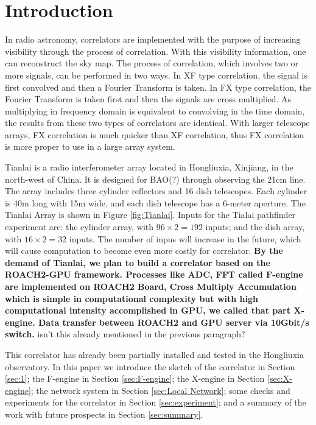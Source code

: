\documentclass{ws-jai}
\begin{document}
\section{Introduction}

	In radio astronomy, correlators are implemented with the purpose of increasing visibility through the process of correlation. With this visibility information, one can reconstruct the sky map\cite{1986isra.book.....T}. The process of correlation, which involves two or more signals, can be performed in two ways. In XF type correlation, the signal is first convolved and then a Fourier Transform is taken. In FX type correlation, the Fourier Transform is taken first and then the signals are cross multiplied. As multiplying in frequency domain is equivalent to convolving in the time domain, the results from these two types of correlators are identical. With larger telescope arrays, FX correlation is much quicker than XF correlation\cite{2016JAI.....502002P}, thus FX correlation is more proper to use in a large array system.
	 
	Tianlai is a radio interferometer array located in Hongliuxia, Xinjiang, in the north-west of China\cite{2012IJMPS..12..256C}. It is designed for BAO(?) through observing the 21cm line. The array includes three cylinder reflectors and 16 dish telescopes. Each cylinder is 40m long with 15m wide, and each dish telescope has a 6-meter aperture. The Tianlai Array is shown in Figure \ref{fig:Tianlai}. Inputs for the Tialai pathfinder experiment are: the cylinder array, with $96\times2=192$ inputs; and the dish array, with $16\times2=32$ inputs. The number of inpus will increase in the future, which will cause computation to become even more costly for correlator. \textbf{By the demand of Tianlai, we plan to build a correlator based on the ROACH2-GPU framework. Processes like ADC, FFT called F-engine are implemented on ROACH2 Board, Cross Multiply Accumulation  which is simple in computational complexity but with high computational intensity accomplished in GPU, we called that part X-engine. Data transfer between ROACH2 and GPU server via 10Gbit/s switch.} isn't this already mentioned in the previous paragraph?

	This correlator has already been partially installed and tested in the Hongliuxia observatory. In this paper we introduce the sketch of the correlator in Section \ref{sec:1}; the F-engine in Section \ref{sec:F-engine}; the X-engine in Section \ref{sec:X-engine}; the network system in Section \ref{sec:Local Network}; some checks and experiments for the correlator in Section \ref{sec:experiment}; and a summary of the work with future prospects in Section \ref{sec:summary}.
\end{document}
